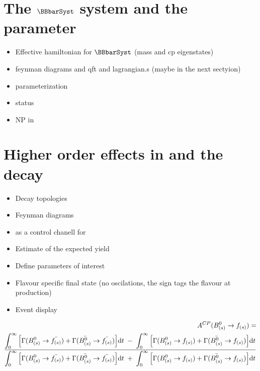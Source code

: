 \section{The $\BBbarSyst$ system and the \phis parameter}
\label{Phenomenology}

\begin{itemize}
  \item Effective hamiltonian for $\BBbarSyst$ (mass and cp eigenstates)
  \item feynman diagrams and qft and lagrangian.s (maybe in the next sectyion)
  \item \phis parameterization
  \item \phis status
  \item NP in \phis
\end{itemize}

\section{Higher order effects in \phis and the \BsJpsiKst decay}
\label{TheBsJpsiKstDecay}

\begin{itemize}
\item Decay topologies
\item Feynman diagrams
\item \BsJpsiKst as a control chanell for \phis
\item Estimate of the expected yield
\item Define parameters of interest
\item Flavour specific final state (no oscilations, the sign tags the flavour at production)
\item Event display
\end{itemize}



{\small
\begin{eqnarray}
A^{CP} (B^0_{(s)} \to f_{(s)})  = &  \nonumber \\
\frac{ \displaystyle \int_0^\infty \Big[ \Gamma(B^0_{(s)} \to \bar{f_{(s)}}) + \Gamma(\bar{B^0_{(s)}} \to \bar{f_{(s)}}) \Big]
{\rm d}t \;-\; \int_0^\infty \Big[ \Gamma(B^0_{(s)} \to f_{(s)}) + \Gamma(\bar{B^0_{(s)}} \to f_{(s)}) \Big]
{\rm d}t}{ \displaystyle \int_0^\infty \Big[ \Gamma(B^0_{(s)} \to \bar{f_{(s)}}) + \Gamma(\bar{B^0_{(s)}} \to \bar{f_{(s)}}) \Big] {\rm d}t
 \;+\; \int_0^\infty \Big[ \Gamma(B^0_{(s)} \to f_{(s)}) + \Gamma(\bar{B^0_{(s)}} \to f_{(s)}) \Big] {\rm d}t}  &
\label{decayrates}
\end{eqnarray}
 }

